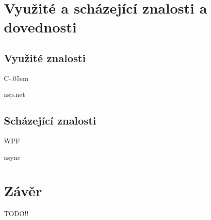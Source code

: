 \documentclass[czech,bachelor,dept460,male,csharp]{diploma}
\newcommand{\Csharp}{%
  {\settoheight{\dimen0}{C}C\kern-.05em \resizebox{!}{\dimen0}{\raisebox{\depth}{\#}}}}
\begin{document}
\section{Využité a scházející znalosti a dovednosti}
	\subsection{Využité znalosti}
		\Csharp
		
		asp.net
	\subsection{Scházející znalosti}
		WPF 
		
		async
		
\section{Závěr}
TODO!!


\printbibliography[title={Literatura}, heading=bibintoc]


\end{document}

